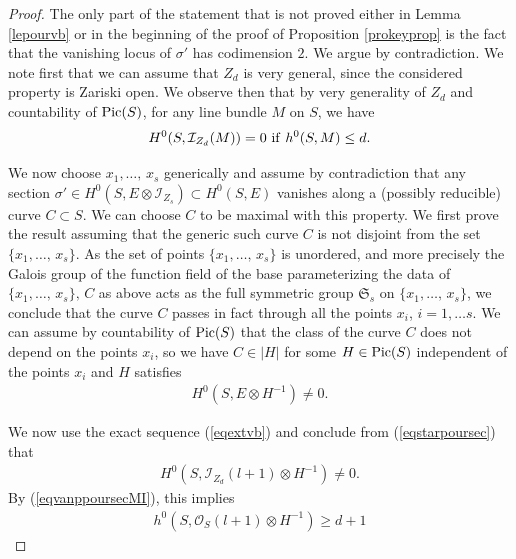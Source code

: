 \documentclass[10pt]{article}
\begin{document}
\begin{proof} The only part of the statement that is not proved either in Lemma \ref{lepourvb} or in the beginning of the proof of Proposition \ref{prokeyprop} is the fact that the vanishing locus of $\sigma'$ has codimension $2$. We argue by contradiction. We note first that we can assume that $Z_d$ is very general, since the considered property is Zariski open. We observe then that by very generality of $Z_d$ and countability of ${\rm Pic}(S)$, for any line bundle $M$ on $S$, we have \begin{eqnarray}\label{eqvanppoursecMI} H^0(S,\mathcal{I}_{Z_d}(M))=0\,\,{\rm if}\,\,h^0(S,M)\leq d.\end{eqnarray}

We now choose $x_1,\ldots,\,x_s$ generically and assume by contradiction that any section
$\sigma'\in H^0(S,E\otimes \mathcal{I}_{Z_s})\subset H^0(S,E)$ vanishes along a (possibly reducible) curve $C\subset S$. We can choose $C$ to be maximal with this property. We  first prove the result assuming that  the generic such curve $C$ is not disjoint from the set $\{x_1,\ldots,\,x_s\}$.
 As the set of points $\{x_1,\ldots,\,x_s\}$ is unordered, and more precisely the Galois group of the function field of the base parameterizing the data of $\{x_1,\ldots,\,x_s\},\,C$ as above acts as the full symmetric group $\mathfrak{S}_s$ on $\{x_1,\ldots,\,x_s\}$, we conclude  that the curve $C$ passes in fact  through all the points $x_i$, $i=1,\ldots s$. We can assume by countability of ${\rm Pic}(S)$ that the class of the curve $C$ does not depend on the points $x_i$, so we have $C\in |H|$ for some $H\in{\rm Pic}(S)$ independent of the points $x_i$   and $H$ satisfies
\begin{eqnarray}\label{eqstarpoursec}H^0(S,E\otimes H^{-1})\not=0.\end{eqnarray}

We now use the exact sequence (\ref{eqextvb}) and conclude from (\ref{eqstarpoursec}) that
\begin{eqnarray}\label{eqencorefinsam1309} H^0(S,\mathcal{I}_{Z_d}(l+1)\otimes H^{-1})\not=0.\end{eqnarray}
By (\ref{eqvanppoursecMI}), this implies
\begin{eqnarray}\label{eqineqpourdimh} h^0(S,\mathcal{O}_S(l+1)\otimes H^{-1})\geq d+1\end{eqnarray}



\end{proof}
\end{document}
